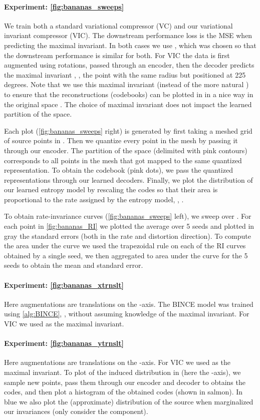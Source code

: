\documentclass[final]{article}
\begin{document}
\paragraph{Experiment: \cref{fig:bananas_sweeps}}
We train both a standard variational compressor (VC) and our variational invariant compressor (VIC).
The downstream performance loss is the MSE when predicting the maximal invariant.
In both cases we use , which was chosen so that the downstream performance is similar for both.
For VIC the data is first augmented using rotations, passed through an encoder, then the decoder predicts the maximal invariant , \ie, the point with the same radius but positioned at 225 degrees.
Note that we use this maximal invariant (instead of the more natural ) to ensure that the reconstructions (codebooks) can be plotted in in a nice way in the original space .
The choice of maximal invariant does not impact the learned partition of the space.

Each plot (\cref{fig:bananas_sweeps} right) is generated by first taking a meshed grid of  source points in .
Then we quantize every point in the mesh by passing it through our encoder.
The partition of the space (delimited with pink contours) corresponds to all points in the mesh that got mapped to the same quantized representation.
To obtain the codebook (pink dots), we pass the quantized representations through our learned decoders.
Finally, we plot the distribution of our learned entropy model by rescaling the codes so that their area is proportional to the rate assigned by the entropy model, \ie, .

To obtain rate-invariance curves (\cref{fig:bananas_sweeps} left), we  sweep over .
For each point in \cref{fig:bananas_RI} we plotted the average over 5 seeds and plotted in gray the standard errors (both in the rate and distortion direction).
To compute the area under the curve we used the trapezoidal rule on each of the RI curves obtained by a single seed, we then aggregated to area under the curve for the 5 seeds to obtain the mean and standard error.


\paragraph{Experiment: \cref{fig:bananas_xtrnslt}}
Here augmentations are translations on the -axis.
The BINCE model was trained using \cref{alg:BINCE}, \ie , without assuming knowledge of the maximal invariant.
For VIC we used  as the maximal invariant.

\paragraph{Experiment: \cref{fig:bananas_ytrnslt}}
Here augmentations are translations on the -axis.
For VIC we used  as the maximal invariant.
To plot of the induced distribution in  (here the -axis), we sample  new points, pass them through our encoder and decoder to obtains the codes, and then plot a histogram of the obtained codes (shown in salmon).
In blue we also plot the (approximate) distribution of the source when marginalized our invariances (\ie only consider the  component).
\end{document}
